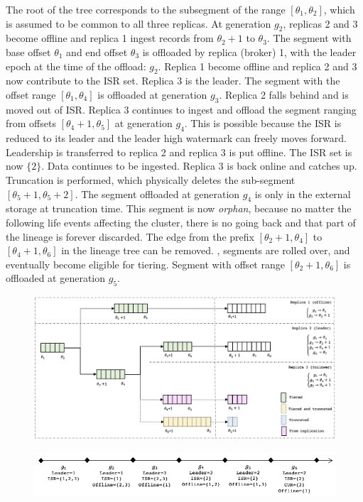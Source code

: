 \documentclass{article}
\begin{document}
\begin{outline}[enumerate]
\1 The root of the tree corresponds to the subsegment of the range $[\theta_1, \theta_2]$, which is assumed to be common to all three replicas.
\1 At generation $g_2$, replicas 2 and 3 become offline and replica 1 ingest records from $\theta_{2} + 1$ to $\theta_3$. The segment with base offset $\theta_1$ and end offset $\theta_3$ is offloaded by replica (broker) 1, with the leader epoch at the time of the offload: $g_2$.
\1 Replica 1 become offline and replica 2 and 3 now contribute to the ISR set. Replica 3 is the leader. The segment with the offset range $[\theta_1, \theta_4]$ is offloaded at generation $g_3$.
\1 Replica 2 falls behind and is moved out of ISR. Replica 3 continues to ingest and offload the segment ranging from offsets $[\theta_4 + 1, \theta_5]$ at generation $g_4$. This is possible because the ISR is reduced to its leader and the leader high watermark can freely moves forward.
\1 Leadership is transferred to replica 2 and replica 3 is put offline. The ISR set is now $\{2\}$. Data continues to be ingested.
\1 Replica 3 is back online and catches up. Truncation is performed, which physically deletes the sub-segment $[\theta_{5}+1, \theta_{5}+2]$. The segment offloaded at generation $g_4$ is only in the external storage at truncation time. This segment is now \textit{orphan}, because no matter the following life events affecting the cluster, there is no going back and that part of the lineage is forever discarded. The edge from the prefix $[\theta_2+1,\theta_4]$ to $[\theta_4+1,\theta_6]$ in the lineage tree can be removed.
\1 , segments are rolled over, and eventually become eligible for tiering. Segment with offset range $[\theta_2+1, \theta_6]$ is offloaded at generation $g_5$.

\end{outline}

\begin{figure}[h!]
	\centering
	\includegraphics[scale=0.55]{lineage-tree-1.png}
	\label{fig:lineage-tree-1}
\end{figure}

\begin{figure}[h!]
	\centering
	\includegraphics[scale=0.6]{seq-generations.png}
	\label{fig:seq-generations}
\end{figure}

\newpage

{}
\end{document}
